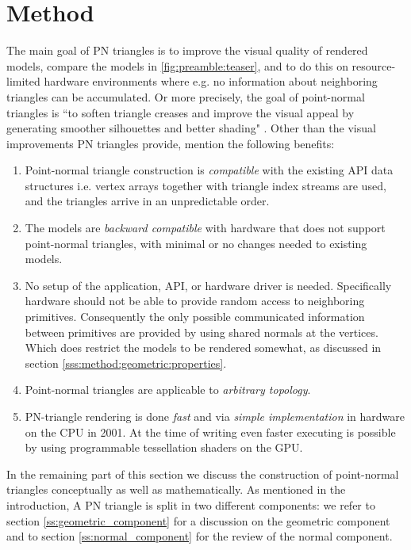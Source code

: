 
\section{Method}
\label{s:method}

The main goal of PN triangles is to improve the visual quality of rendered models, compare the models in \cref{fig:preamble:teaser}, and to do this on resource-limited hardware environments where e.g. no information about neighboring triangles can be accumulated. Or more precisely, the goal of point-normal triangles is ``to soften triangle creases and improve the visual appeal by generating smoother silhouettes and better shading" \cite{vlachos2001curved}. Other than the visual improvements PN triangles provide, \citeauthor{vlachos2001curved} mention the following benefits:

\begin{enumerate}[label=(\roman*)]
 	\item 
 		Point-normal triangle construction is \textit{compatible} with the existing API data structures i.e. vertex arrays together with triangle index streams are used, and the triangles arrive in an unpredictable order.
 	\item 
 		The models are \textit{backward compatible} with hardware that does not support point-normal triangles, with minimal or no changes needed to existing models.
 	\item 
 		No setup of the application, API, or hardware driver is needed. Specifically hardware should not be able to provide random access to neighboring primitives. Consequently the only possible communicated information between primitives are provided by using shared normals at the vertices. Which does restrict the models to be rendered somewhat, as discussed in section \ref{sss:method:geometric:properties}.
 	\item 
 		Point-normal triangles are applicable to \textit{arbitrary topology}.
 	\item 
 		PN-triangle rendering is done \textit{fast} and via \textit{simple implementation} in hardware on the CPU in 2001. At the time of writing even faster executing is possible by using programmable tessellation shaders on the GPU.
 \end{enumerate} 

In the remaining part of this section we discuss the construction of point-normal triangles conceptually as well as mathematically. As mentioned in the introduction, A PN triangle is split in two different components: we refer to section \ref{ss:geometric_component} for a discussion on the geometric component and to section \ref{ss:normal_component} for the review of the normal component.


